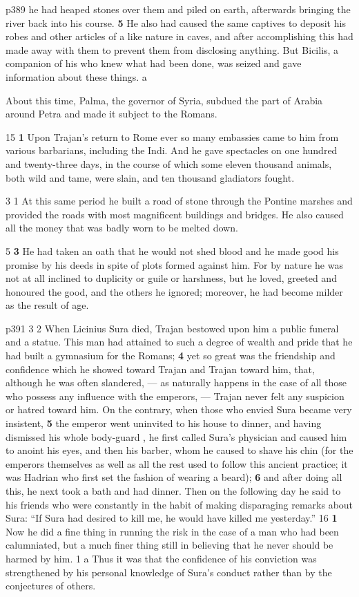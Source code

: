 p389 he had heaped stones over them and piled on earth, afterwards bringing the river back into his course. \textbf{5} He also had caused the same captives to deposit his robes and other articles of a like nature in caves, and after accomplishing this had made away with them to prevent them from disclosing anything. But Bicilis, a companion of his who knew what had been done, was seized and gave information about these things.\texthebrew{⁠} a

About this time, Palma, the governor of Syria, subdued the part of Arabia around Petra and made it subject to the Romans.

15
\textbf{1} Upon Trajan's return to Rome ever so many embassies came to him from various barbarians, including the Indi. And he gave spectacles on one hundred and twenty-three days, in the course of which some eleven thousand animals, both wild and tame, were slain, and ten thousand gladiators fought.

3 1 At this same period he built a road of stone through the Pontine marshes and provided the roads with most magnificent buildings and bridges. He also caused all the money that was badly worn to be melted down.

5
\textbf{3} He had taken an oath that he would not shed blood and he made good his promise by his deeds in spite of plots formed against him. For by nature he was not at all inclined to duplicity or guile or harshness, but he loved, greeted and honoured the good, and the others he ignored; moreover, he had become milder as the result of age.

p391
3 2 When Licinius Sura died, Trajan bestowed upon him a public funeral and a statue. This man had attained to such a degree of wealth and pride that he had built a gymnasium for the Romans; \textbf{4} yet so great was the friendship and confidence which he showed toward Trajan and Trajan toward him, that, although he was often slandered, \texthebrew{—} as naturally happens in the case of all those who possess any influence with the emperors, \texthebrew{—} Trajan never felt any suspicion or hatred toward him. On the contrary, when those who envied Sura became very insistent, \textbf{5} the emperor went uninvited to his house to dinner, and having dismissed his whole body-guard , he first called Sura's physician and caused him to anoint his eyes, and then his barber, whom he caused to shave his chin (for the emperors themselves as well as all the rest used to follow this ancient practice; it was Hadrian who first set the fashion of wearing a beard); \textbf{6} and after doing all this, he next took a bath and had dinner. Then on the following day he said to his friends who were constantly in the habit of making disparaging remarks about Sura: ``If Sura had desired to kill me, he would have killed me yesterday.''
16
\textbf{1} Now he did a fine thing in running the risk in the case of a man who had been calumniated, but a much finer thing still in believing that he never should be harmed by him. 1 a Thus it was that the confidence of his conviction was strengthened by his personal knowledge of Sura's conduct rather than by the conjectures of others.

